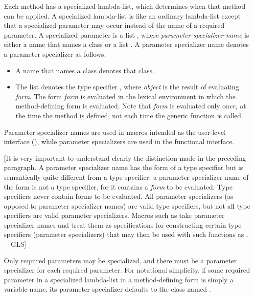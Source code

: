 Each method has a {\bit specialized lambda-list}, which determines
when that method can be applied.  A specialized lambda-list is like
an ordinary lambda-list except that a {\bit specialized parameter\/}
may occur instead of the name of a required parameter.  A specialized parameter
is a list ,
where \emph{parameter-specializer-name\/} is either
a name that names a class or a list .
A parameter specializer name denotes a parameter specializer as follows:

\begin{itemize}
\item  A name that names a class denotes that class.

\item  The list  denotes the type specifier
, where \emph{object\/} is the result of
evaluating \emph{form\/}.  The form \emph{form\/} is evaluated in the
lexical environment in which the method-defining form is
evaluated.  Note that \emph{form\/} is evaluated only once, at the time
the method is defined, not each time the generic function is called.
\end{itemize}

Parameter specializer names are used in macros intended as the
user-level interface (), while parameter specializers
are used in the functional interface.

[It is very important to understand clearly the distinction made
in the preceding paragraph.  A parameter specializer name
has the form of a type specifier but is semantically quite different
from a type specifier: a parameter specializer name of the form
 is not a type specifier, for it contains
a \emph{form\/} to be evaluated.   Type specifiers
never contain forms to be evaluated.  All parameter specializers
(as opposed to parameter specializer names) are valid type specifiers,
but not all type specifiers are valid parameter specializers.  Macros such as 
take parameter specializer names and treat them as specifications for
constructing certain type specifiers (parameter specializers) that may then be used
with such functions as .---GLS]


Only required parameters may be specialized, and there must be a
parameter specializer for each required parameter.  For notational
simplicity, if some required parameter in a specialized lambda-list in
a method-defining form is simply a variable name, its parameter
specializer defaults to the class named .

